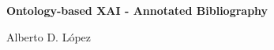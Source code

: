 \documentclass[12pt]{article}
\begin{document}
\begin{center}
   {\large\textbf{Ontology-based XAI - Annotated Bibliography}}
\medskip

   {\large   Alberto D. L\'opez
}
\end{center}
\nocite{*}



\end{document}
